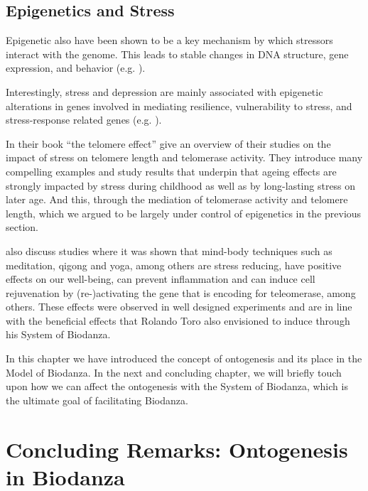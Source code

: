 \documentclass[
  11pt,
]{book}
\begin{document}
\hypertarget{epigenetics-and-stress}{%
\section{Epigenetics and Stress}\label{epigenetics-and-stress}}

Epigenetic also have been shown to be a key mechanism by which stressors interact with the genome.
This leads to stable changes in DNA structure, gene expression, and behavior (e.g. \citet{Park2019}).

Interestingly, stress and depression are mainly
associated with epigenetic alterations in genes involved in mediating resilience, vulnerability to stress, and stress-response related genes (e.g. \citet{Park2019}).

In their book ``the telomere effect'' \citet{BlackburnEpel2017} give an overview of their studies on the impact of stress on telomere length and telomerase activity.
They introduce many compelling examples and study results that underpin that ageing effects are strongly impacted by stress during childhood as well as by long-lasting stress on later age. And this, through the mediation of telomerase activity and telomere length, which we argued to be largely under control of epigenetics in the previous section.

\citet{BlackburnEpel2017} also discuss studies where it was shown that mind-body techniques such as meditation, qigong and yoga, among others are stress reducing, have positive effects on our well-being, can prevent inflammation and can induce cell rejuvenation by (re-)activating the gene that is encoding for teleomerase, among others. These effects were observed in well designed experiments and are in line with the beneficial effects that Rolando Toro also envisioned to induce through his System of Biodanza.

In this chapter we have introduced the concept of ontogenesis and its place in the Model of Biodanza. In the next and concluding chapter, we will briefly touch upon how we can affect the ontogenesis with the System of Biodanza, which is the ultimate goal of facilitating Biodanza.

\hypertarget{concluding-remarks-ontogenesis-in-biodanza}{%
\chapter{Concluding Remarks: Ontogenesis in Biodanza}\label{concluding-remarks-ontogenesis-in-biodanza}}
\end{document}
